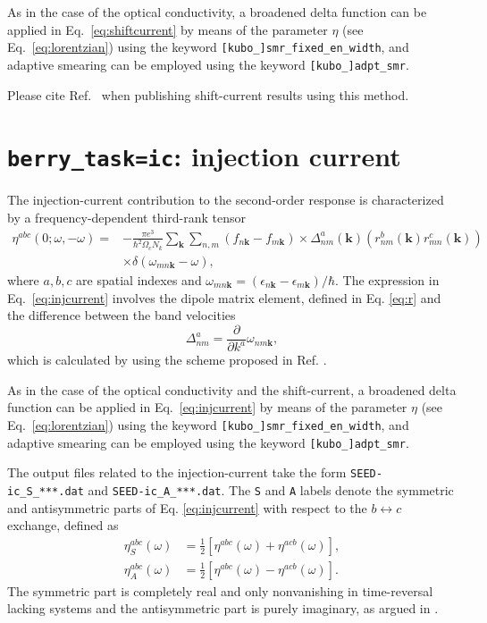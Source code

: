 As in the case of the optical conductivity, a broadened delta function can be 
applied in Eq.~\ref{eq:shiftcurrent} by means of the parameter
$\eta$ (see Eq.~\ref{eq:lorentzian}) using the keyword 
{\tt[kubo\_]smr\_fixed\_en\_width}, and adaptive smearing can 
be employed using the keyword {\tt [kubo\_]adpt\_smr}. 

Please cite Ref.~\cite{ibanez-azpiroz_ab_2018} when publishing shift-current results using this method.

\section{{\tt berry\_task=ic}: injection current}

The injection-current contribution to the second-order response
is characterized by a frequency-dependent third-rank tensor \cite{ruiz-ArXiv2023}
\begin{equation}\label{eq:injcurrent}
\begin{split}
\eta^{abc}(0;\omega,-\omega)=&-\frac{\pi e^3}{\hbar^2 \Omega_c N_k}
\sum_{\bm{k}} \sum_{n,m}(f_{n\bm{k}}-f_{m\bm{k}})
\times
\Delta^a_{nm}(\bm{k})\left(r^b_{ nm}(\bm{k})r^c_{mn}(\bm{k})\right)\\
&\times \delta(\omega_{mn\bm{k}}-\omega),
\end{split}
\end{equation}
where $a,b,c$ are spatial indexes
and $\omega_{mn\bm{k}}=(\epsilon_{n\bm{k}}-\epsilon_{m\bm{k}})/\hbar$.
The expression in Eq.~\ref{eq:injcurrent} involves 
the dipole matrix element, defined in Eq. \eqref{eq:r}
and the difference between the band velocities
\begin{equation}
	\label{eq:delta}
	\Delta^a_{nm} = \frac{\partial}{\partial k^a} \omega_{nm\bm{k}},
\end{equation}
which is calculated by using the scheme proposed in Ref. \cite{yates-prb07}.

As in the case of the optical conductivity and the shift-current, a broadened delta function can be 
applied in Eq.~\ref{eq:injcurrent} by means of the parameter
$\eta$ (see Eq.~\ref{eq:lorentzian}) using the keyword 
{\tt[kubo\_]smr\_fixed\_en\_width}, and adaptive smearing can 
be employed using the keyword {\tt [kubo\_]adpt\_smr}. 

The output files related to the injection-current take the form \verb|SEED-ic_S_***.dat| and \verb|SEED-ic_A_***.dat|. 
The \verb|S| and \verb|A| labels denote the symmetric and antisymmetric parts of Eq. \eqref{eq:injcurrent} with respect to the $b\leftrightarrow c$ exchange, defined as
\begin{subequations}
	\label{eq:inj_sym_asym_components}
	\begin{align}
	\eta^{abc}_S(\omega) & = \frac{1}{2}\left[\eta^{abc}(\omega) + \eta^{acb}(\omega)\right],\label{eq:inj_sym}\\
	\eta^{abc}_A(\omega) & = \frac{1}{2}\left[\eta^{abc}(\omega) - \eta^{acb}(\omega)\right].\label{eq:inj_asym}
	\end{align}
\end{subequations}
The symmetric part is completely real and only nonvanishing in time-reversal lacking systems and the antisymmetric part is purely imaginary, as argued in \cite{ruiz-ArXiv2023}.

